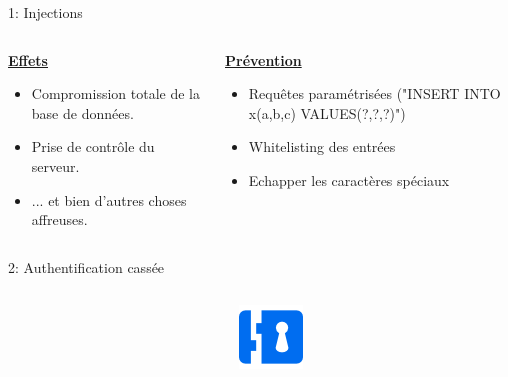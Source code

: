 \documentclass[final,hyperref={pdfpagelabels=false}]{beamer}
\begin{document}
\begin{frame}[t]
\begin{columns}[t]
\begin{column}{.465\textwidth}
\begin{block}{1: Injections}
	\begin{columns}[T]
	\begin{column}{.5\textwidth} %
	\vfill
	\uline{\textbf{Effets}}
	\begin{itemize}
		\item Compromission totale de la base de données.
		\item Prise de contrôle du serveur.
		\item ... et bien d'autres choses affreuses.
	\end{itemize}
		\end{column}

	\begin{column}{.5\textwidth} %
		\vfill
		\uline{\textbf{Prévention}}
		\begin{itemize}
			\item Requêtes paramétrisées ("INSERT INTO x(a,b,c) VALUES(?,?,?)")
			\item Whitelisting des entrées 
			\item Echapper les caractères spéciaux
		\end{itemize}
	\end{column}
	\end{columns}

\end{block}

            
\begin{block}{2: Authentification cassée}

	\begin{columns}[T]

		\begin{column}{.01\textwidth}
		\end{column}
		\begin{column}{.115\textwidth} %
			\includegraphics[scale=2.3]{rimlock.png}
		\end{column}


\end{columns}
\end{block}
\end{column}
\end{columns}
\end{frame}
\end{document}
